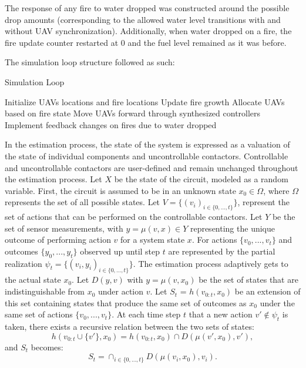 \documentclass[journal]{IEEEtran}
\begin{document}
The response of any fire to water dropped was constructed around the possible drop amounts (corresponding to the allowed water level transitions with and without UAV synchronization). Additionally, when water dropped on a fire, the fire update counter restarted at 0 and the fuel level remained as it was before.

The simulation loop structure followed as such:

\begin{algorithm}
	\caption{Simulation Loop}\label{alg:sim}
	\begin{algorithmic}[1]
		\State Initialize UAVs locations and fire locations
		\State Update fire growth
		\State Allocate UAVs based on fire state
		\State Move UAVs forward through synthesized controllers
		\State Implement feedback changes on fires due to water dropped
		\EndWhile
		\EndProcedure
	\end{algorithmic}
\end{algorithm}

\iffalse
In the estimation process, the state of the system is expressed as a valuation of the state of individual components and uncontrollable contactors. Controllable and uncontrollable contactors are user-defined and remain unchanged throughout the estimation process. Let $X$ be the state of the circuit, modeled as a random variable. First, the circuit is assumed to be in an unknown state $x_{0} \in \Omega$, where $\Omega$ represents the set of all possible states. Let $V = \{(v_{i})_{i\in\{0,...,t\}}\}$, represent the set of actions that can be performed on the controllable contactors. Let $Y$ be the set of sensor measurements, with $y = \mu(v,x) \in Y$ representing the unique outcome of performing action $v$ for a system state $x$. For actions $\{v_{0}, ..., v_{t}\}$ and outcomes $\{y_{0}, ..., y_{t}\}$ observed up until step $t$ are represented by the partial realization $\psi_{t} = \{(v_{i}, y_{i})_{i\in\{0,...,t\}}\}$. The estimation process adaptively gets to the actual state $x_{0}$. Let $D(y,v)$ with $y = \mu(v,x_{0})$ be the set of states that are indistinguishable from $x_{0}$ under action $v$. Let $S_{t}$ = $h(v_{0:t}, x_{0})$ be an extension of this set containing states that produce the same set of outcomes as $x_{0}$ under the same set of actions $\{v_{0}, ..., v_{t}\}$. At each time step $t$ that a new action $v'\not\in\psi_{t}$ is taken, there exists a recursive relation between the two sets of states: 
\begin{equation}h(v_{0:t}\cup\{v'\},x_{0}) = h(v_{0:t}, x_{0})\cap D(\mu(v', x_{0}),v'), \end{equation}
and $S_{t}$ becomes:
\begin{equation}S_{t}=\cap_{i\in\{0,\ldots, t\}}D(\mu(v_{i}, x_{0}), v_{i}). \end{equation}
\end{document}
